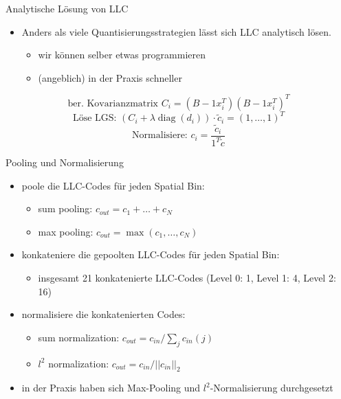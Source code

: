 \begin{frame}[t, fragile]{Analytische Lösung von LLC}
	\begin{itemize}
		\item Anders als viele Quantisierungsstrategien lässt sich LLC analytisch lösen.
		\begin{itemize}
			\item wir können selber etwas programmieren
			\item (angeblich) in der Praxis schneller
		\end{itemize}
	\end{itemize}
	\begin{equation*}
		\text{ber. Kovarianzmatrix } C_i = (B-1x_i^T)(B-1x_i^T)^T
	\end{equation*}
	\begin{equation}
		\text{Löse LGS: } (C_i + \lambda\mathop{diag}(d_i)) \cdot \tilde{c}_i = (1, \dots, 1)^T
	\end{equation}
	\begin{equation}
	\text{Normalisiere: } c_i = \frac{\tilde{c}_i}{1^T\tilde{c}}
	\end{equation}
\end{frame}

\begin{frame}[t, fragile]{Pooling und Normalisierung}
	\begin{itemize}
		\item poole die LLC-Codes für jeden Spatial Bin:
		\begin{itemize}
			\item sum pooling: $c_{out} = c_1 + \dots + c_N$
			\item max pooling: $c_{out} = \max(c_1, \dots, c_N)$
		\end{itemize}
		\item konkateniere die gepoolten LLC-Codes für jeden Spatial Bin:
		\begin{itemize}
			\item insgesamt 21 konkatenierte LLC-Codes (Level 0: 1, Level 1: 4, Level 2: 16)
		\end{itemize}
		\item normalisiere die konkatenierten Codes:
		\begin{itemize}
			\item sum normalization: $c_{out} = c_{in} / \sum_{j}c_{in}(j)$
			\item $\mathit{l}^2$ normalization: $c_{out} = c_{in} / ||c_{in}||_2$
		\end{itemize}
		\item in der Praxis haben sich Max-Pooling und $\mathit{l}^2$-Normalisierung durchgesetzt \cite{wyylhg10}
	\end{itemize}
\end{frame}

